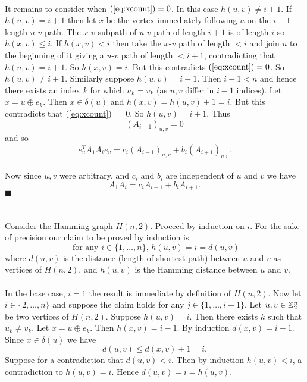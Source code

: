 \documentclass[letterpaper,12pt,oneside,onecolumn]{article}
\newcommand{\1}{\mathbbm{1}}
\begin{document}
\paragraph{}
It remains to consider when $(\ref{eq:xcount}) = 0$. In this case $h(u,v) \neq i \pm 1$. If $h(u,v) = i + 1$ then let $x$ be the vertex immediately following $u$ on the $i+1$ length $u$-$v$ path. The $x$-$v$ subpath of $u$-$v$ path of length $i+1$ is of length $i$ so $h(x, v) \leq i$. If $h(x,v) < i$ then take the $x$-$v$ path of length $<i$ and join $u$ to the beginning of it giving a $u$-$v$ path of length $< i+1$, contradicting that $h(u,v) = i+1$. So $h(x,v) = i$. But this contradicts $(\ref{eq:xcount}) = 0$. So $h(u,v) \neq i+1$. Similarly suppose $h(u,v) = i-1$. Then $i-1<n$ and hence there exists an index $k$ for which $u_k = v_k$ (as $u,v$ differ in $i-1$ indices). Let $x = u \oplus e_k$. Then $x \in \delta(u)$ and $h(x,v) = h(u,v) + 1 = i.$ But this contradicts that (\ref{eq:xcount}) $=0$. So $h(u,v) = i \pm 1$. Thus $$(A_{i\pm1})_{u,v} = 0$$ and so
$$e_u^T A_1 A_i e_v = c_i (A_{i-1})_{u,v} + b_i(A_{i+1})_{u.v}.$$
\paragraph{}
Now since $u,v$ were arbitrary, and $c_i$ and $b_i$ are independent of $u$ and $v$ we have
$$A_1 A_i = c_i A_{i-1} + b_i A_{i+1}.$$ $\blacksquare$

\section{}
\paragraph{}
Consider the Hamming graph $H(n,2)$. Proceed by induction on $i$. For the sake of precision our claim to be proved by induction is
$$\text{ for any $i \in \{1, \dots, n\}$, $h(u,v) = i=d(u,v)$}$$
where $d(u,v)$ is the distance (length of shortest path) between $u$ and $v$ as vertices of $H(n,2)$, and $h(u,v)$ is the Hamming distance between $u$ and $v$.
\paragraph{}
In the base case, $i=1$ the result is immediate by definition of $H(n,2)$. Now let $i \in \{2,\dots, n\}$ and suppose the claim holds for any $j \in \{1, \dots, i-1\}$. Let $u,v \in \mathbb{Z}^n_2$ be two vertices of $H(n,2)$. Suppose $h(u,v) = i$. Then there exists $k$ such that $u_k \neq v_k$. Let $x = u \oplus e_k$. Then $h(x,v) = i-1$. By induction $d(x,v) = i-1$. Since $x \in \delta(u)$ we have $$d(u,v) \leq d(x,v) +1 = i.$$
Suppose for a contradiction that $d(u,v) < i$. Then by induction $h(u,v) < i$, a contradiction to $h(u,v) = i$. Hence $d(u,v) = i = h(u,v)$.
\end{document}
